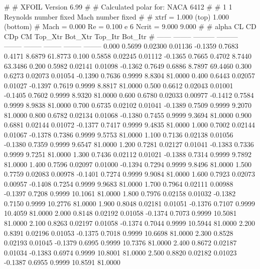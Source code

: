 #  
#       XFOIL         Version 6.99
#  
# Calculated polar for: NACA 6412                                       
#  
# 1 1 Reynolds number fixed          Mach number fixed         
#  
# xtrf =   1.000 (top)        1.000 (bottom)  
# Mach =   0.000     Re =     0.100 e 6     Ncrit =   9.000  9.000
#  
#   alpha    CL        CD       CDp       CM     Top_Xtr  Bot_Xtr  Top_Itr  Bot_Itr
#  ------ -------- --------- --------- -------- -------- -------- -------- --------
   0.000   0.5699   0.02300   0.01136  -0.1359   0.7683   0.4171   8.6879  61.8773
   0.100   0.5858   0.02245   0.01112  -0.1365   0.7665   0.4702   8.7440  63.3486
   0.200   0.5982   0.02141   0.01098  -0.1362   0.7649   0.6886   8.7897  69.4460
   0.300   0.6273   0.02073   0.01054  -0.1390   0.7636   0.9999   8.8304  81.0000
   0.400   0.6443   0.02057   0.01027  -0.1397   0.7619   0.9999   8.8817  81.0000
   0.500   0.6612   0.02043   0.01001  -0.1405   0.7602   0.9999   8.9320  81.0000
   0.600   0.6780   0.02033   0.00977  -0.1412   0.7584   0.9999   8.9838  81.0000
   0.700   0.6735   0.02102   0.01041  -0.1389   0.7509   0.9999   9.2070  81.0000
   0.800   0.6782   0.02134   0.01068  -0.1380   0.7455   0.9999   9.3694  81.0000
   0.900   0.6881   0.02144   0.01072  -0.1377   0.7417   0.9999   9.4835  81.0000
   1.000   0.7002   0.02144   0.01067  -0.1378   0.7386   0.9999   9.5753  81.0000
   1.100   0.7136   0.02138   0.01056  -0.1380   0.7359   0.9999   9.6547  81.0000
   1.200   0.7281   0.02127   0.01041  -0.1383   0.7336   0.9999   9.7251  81.0000
   1.300   0.7436   0.02112   0.01021  -0.1388   0.7314   0.9999   9.7892  81.0000
   1.400   0.7596   0.02097   0.01000  -0.1394   0.7294   0.9999   9.8496  81.0000
   1.500   0.7759   0.02083   0.00978  -0.1401   0.7274   0.9999   9.9084  81.0000
   1.600   0.7923   0.02073   0.00957  -0.1408   0.7254   0.9999   9.9683  81.0000
   1.700   0.7964   0.02111   0.00988  -0.1397   0.7208   0.9999  10.1061  81.0000
   1.800   0.7976   0.02158   0.01032  -0.1382   0.7150   0.9999  10.2776  81.0000
   1.900   0.8048   0.02181   0.01051  -0.1376   0.7107   0.9999  10.4059  81.0000
   2.000   0.8148   0.02192   0.01058  -0.1374   0.7073   0.9999  10.5081  81.0000
   2.100   0.8263   0.02197   0.01058  -0.1374   0.7044   0.9999  10.5944  81.0000
   2.200   0.8391   0.02196   0.01053  -0.1375   0.7018   0.9999  10.6698  81.0000
   2.300   0.8528   0.02193   0.01045  -0.1379   0.6995   0.9999  10.7376  81.0000
   2.400   0.8672   0.02187   0.01034  -0.1383   0.6974   0.9999  10.8001  81.0000
   2.500   0.8820   0.02182   0.01023  -0.1387   0.6955   0.9999  10.8591  81.0000
